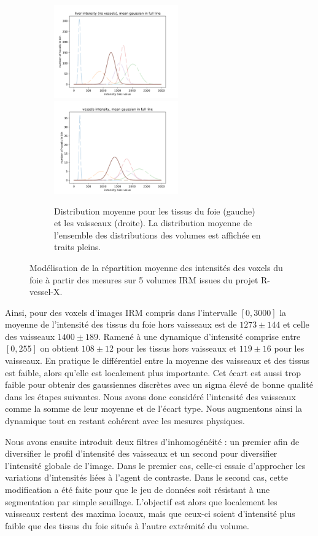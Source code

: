 \begin{figure}[!ht]
  \begin{subfigure}{\textwidth}
    \centering
    \includegraphics[height=4cm]{Images/gen_mri_liver_mean_intensity.pdf}
    \includegraphics[height=4cm]{Images/gen_mri_vessels_mean_intensity.pdf}
    \caption{Distribution moyenne pour les tissus du foie (gauche) et les vaisseaux (droite). La distribution moyenne de l'ensemble des distributions des volumes est affichée en traits pleins.}
  \end{subfigure}
  \caption{Modélisation de la répartition moyenne des intensités des voxels du foie à partir des mesures sur 5 volumes IRM issues du projet R-vessel-X.}
  \label{fig:Distributions_mri_intensities}
\end{figure}

Ainsi, pour des voxels d'images IRM compris dans l'intervalle $[0,3000]$ la moyenne de l'intensité des tissus du foie hors vaisseaux est de $1273 \pm 144$ et celle des vaisseaux $1400 \pm 189$. Ramené à une dynamique d'intensité comprise entre $[0, 255]$ on obtient $108 \pm 12$ pour les tissus hors vaisseaux et $119 \pm 16$ pour les vaisseaux. En pratique le différentiel entre la moyenne des vaisseaux et des tissus est faible, alors qu'elle est localement plus importante. Cet écart est aussi trop faible pour obtenir des gaussiennes discrètes avec un sigma élevé de bonne qualité dans les étapes suivantes. Nous avons donc considéré l'intensité des vaisseaux comme la somme de leur moyenne et de l'écart type. Nous augmentons ainsi la dynamique tout en restant cohérent avec les mesures physiques.

Nous avons ensuite introduit deux filtres d'inhomogénéité : un premier afin de diversifier le profil d'intensité des vaisseaux et un second pour diversifier l'intensité globale de l'image. Dans le premier cas, celle-ci essaie d'approcher les variations d'intensités liées à l'agent de contraste. Dans le second cas, cette modification a été faite pour que le jeu de données soit résistant à une segmentation par simple seuillage. L'objectif est alors que localement les vaisseaux restent des maxima locaux, mais que ceux-ci soient d'intensité plus faible que des tissus du foie situés à l'autre extrémité du volume.

